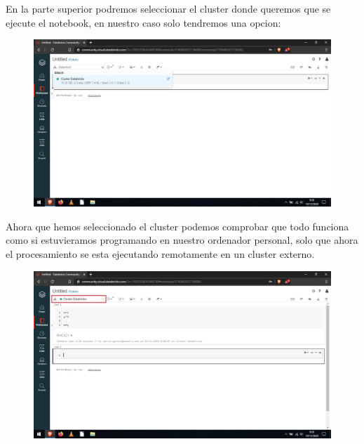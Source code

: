 \documentclass[a4paper,10pt]{article}
\begin{document}
En la parte superior podremos seleccionar el cluster donde queremos que se ejecute el notebook, en nuestro caso solo tendremos una opcion:

\begin{figure}[H]
\begin{center}
\includegraphics[width=500pt]{./fotos/Databricks/15 - Databricks.jpg}
\end{center}
\end{figure}

Ahora que hemos seleccionado el cluster podemos comprobar que todo funciona como si estuvieramos programando en nuestro ordenador personal, solo que ahora el procesamiento se esta ejecutando remotamente en un cluster externo.

\begin{figure}[H]
\begin{center}
\includegraphics[width=500pt]{./fotos/Databricks/16 - Databricks (V).jpg}
\end{center}
\end{figure}

\clearpage
\end{document}
